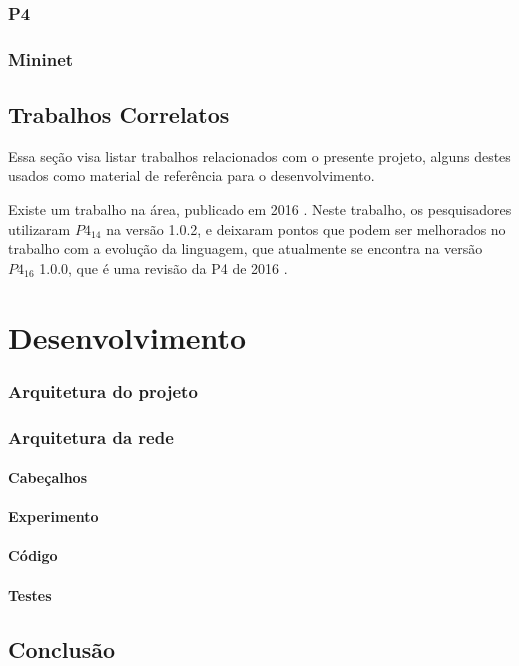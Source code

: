 \documentclass[12pt,
openright, 
oneside,
a4paper,
brazil]{facom-ufu-abntex2}
\theoremstyle{definition}
\begin{document}
\subsection{P4}
\subsection{Mininet}


\section{Trabalhos Correlatos}
Essa seção visa listar trabalhos relacionados com o presente projeto, alguns destes usados
como material de referência para o desenvolvimento.

Existe um trabalho na área, publicado em 2016 \citep{dang2016paxos}. Neste trabalho,
os pesquisadores utilizaram $P4_{14}$ na versão 1.0.2, e deixaram pontos que podem ser
melhorados no trabalho com a evolução da linguagem, que atualmente se encontra na versão
$P4_{16}$ 1.0.0, que é uma revisão da P4 de 2016 \citep{paxos16spec}.


\chapter{Desenvolvimento}
 
\subsection{Arquitetura do projeto}
\subsection{Arquitetura da rede}
\subsubsection{Cabeçalhos}
\subsubsection{Experimento}
\subsubsection{Código}
\subsubsection{Testes}

\section{Conclusão}





\end{document}
